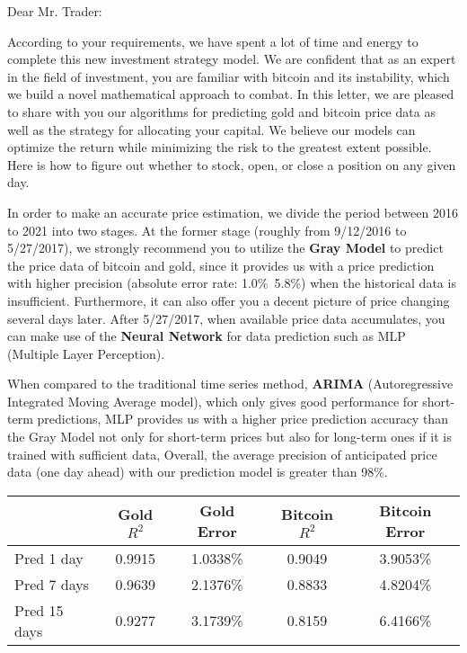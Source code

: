 \documentclass{mcmthesis}
\begin{document}
	Dear Mr. Trader: 
	
	According to your requirements, we have spent a lot of time and energy to complete this new investment strategy model. We are confident that as an expert in the field of investment, you are familiar with bitcoin and its instability, which we build a novel mathematical approach to combat. In this letter, we are pleased to share with you our algorithms for predicting gold and bitcoin price data as well as the strategy for allocating your capital. We believe our models can optimize the return while minimizing the risk to the greatest extent possible. Here is how to figure out whether to stock, open, or close a position on any given day. 
	
	In order to make an accurate price estimation, we divide the period between 2016 to 2021 into two stages. At the former stage (roughly from 9/12/2016 to 5/27/2017), we strongly recommend you to utilize the \textbf{Gray Model} to predict the price data of bitcoin and gold, since it provides us with a price prediction with higher precision (absolute error rate: 1.0\%~5.8\%) when the historical data is insufficient. Furthermore, it can also offer you a decent picture of price changing several days later. After 5/27/2017, when available price data accumulates, you can make use of the \textbf{Neural Network} for data prediction such as MLP (Multiple Layer Perception). 
	
	When compared to the traditional time series method, \textbf{ARIMA} (Autoregressive Integrated Moving Average model), which only gives good performance for short-term predictions, MLP provides us with a higher price prediction accuracy than the Gray Model not only for short-term prices but also for long-term ones if it is trained with sufficient data, Overall, the average precision of anticipated price data (one day ahead) with our prediction model is greater than 98\%. 
	
	\begin{center}
		\begin{tabular}{l|cccc}
			\toprule
			& Gold $R^2$ & Gold Error & Bitcoin $R^2$ & Bitcoin Error \\ \midrule
			Pred 1 day & 0.9915 & 1.0338\% & 0.9049 & 3.9053\% \\
			Pred 7 days & 0.9639 & 2.1376\% & 0.8833 & 4.8204\% \\
			Pred 15 days & 0.9277 & 3.1739\% & 0.8159 & 6.4166\% \\
			\bottomrule
		\end{tabular}
	\end{center}
	
\end{document}
